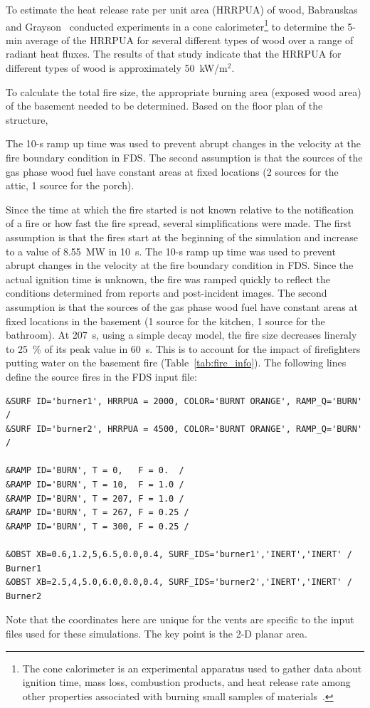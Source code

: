 \documentclass[12pt,oneside]{book}
\begin{document}
To estimate the heat release rate per unit area (HRRPUA) of wood, Babrauskas and Grayson~\cite{babrauskas1990} conducted experiments in a cone calorimeter\footnote{The cone calorimeter is an experimental apparatus used to gather data about ignition time, mass loss, combustion products, and heat release rate among other properties associated with burning small samples of materials~\cite{ASTM:E1355}.} to determine the 5-min average of the HRRPUA for several different types of wood over a range of radiant heat fluxes. The results of that study indicate that the HRRPUA for different types of wood is approximately 50~kW/m$^2$.

To calculate the total fire size, the appropriate burning area (exposed wood area) of the basement needed to be determined. Based on the floor plan of the structure,

The 10-s ramp up time was used to prevent abrupt changes in the velocity at the fire boundary condition in FDS. The second assumption is that the sources of the gas phase wood fuel have constant areas at fixed locations (2 sources for the attic, 1 source for the porch).

Since the time at which the fire started is not known relative to the notification of a fire or how fast the fire spread, several simplifications were made. The first assumption is that the fires start at the beginning of the simulation and increase to a value of 8.55~MW in 10~s. The 10-s ramp up time was used to prevent abrupt changes in the velocity at the fire boundary condition in FDS. Since the actual ignition time is unknown, the fire was ramped quickly to reflect the conditions determined from reports and post-incident images. The second assumption is that the sources of the gas phase wood fuel have constant areas at fixed locations in the basement (1 source for the kitchen, 1 source for the bathroom).  At 207~s, using a simple decay model, the fire size decreases lineraly to 25~\% of its peak value in 60~s. This is to account for the impact of firefighters putting water on the basement fire (Table~\ref{tab:fire_info}). The following lines define the source fires in the FDS input file:

\begin{lstlisting}
&SURF ID='burner1', HRRPUA = 2000, COLOR='BURNT ORANGE', RAMP_Q='BURN' /
&SURF ID='burner2', HRRPUA = 4500, COLOR='BURNT ORANGE', RAMP_Q='BURN' /

&RAMP ID='BURN', T = 0,   F = 0.  /
&RAMP ID='BURN', T = 10,  F = 1.0 /
&RAMP ID='BURN', T = 207, F = 1.0 /
&RAMP ID='BURN', T = 267, F = 0.25 /
&RAMP ID='BURN', T = 300, F = 0.25 /

&OBST XB=0.6,1.2,5,6.5,0.0,0.4, SURF_IDS='burner1','INERT','INERT' /  Burner1
&OBST XB=2.5,4,5.0,6.0,0.0,0.4, SURF_IDS='burner2','INERT','INERT' /  Burner2
\end{lstlisting}
Note that the coordinates here are unique for the vents are specific to the input files used for these simulations. The key point is the 2-D planar area.
\end{document}
